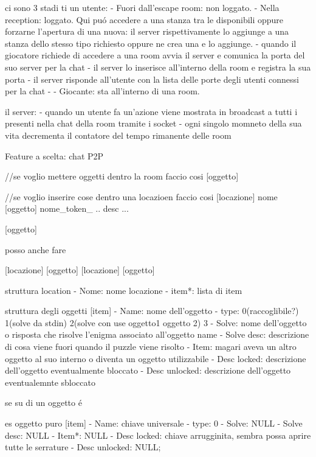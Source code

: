 ci sono 3 stadi ti un utente:
  - Fuori dall'escape room: non loggato.
  - Nella reception: loggato. Qui puó accedere a una stanza tra le disponibili oppure forzarne l'apertura di una nuova: il server rispettivamente 
  lo aggiunge a una stanza dello stesso tipo richiesto oppure ne crea una e lo aggiunge.
      - quando il giocatore richiede di accedere a una room avvia il server e comunica la porta del suo server per la chat
      - il server lo inserisce all'interno della room e registra la sua porta
      - il server risponde all'utente con la lista delle porte degli utenti connessi per la chat 
      - 
  - Giocante: sta all'interno di una room.

il server:
  - quando un utente fa un'azione viene mostrata in broadcast a tutti i presenti nella chat della room tramite
i socket
  - ogni singolo momneto della sua vita decrementa il contatore del tempo rimanente delle room 

Feature a scelta: chat P2P




//se voglio mettere oggetti dentro la room faccio cosi
[oggetto]

//se voglio inserire cose dentro una locazioen faccio cosi
[locazione] nome
  [oggetto]
    nome_token_ .. desc ...
    
  [oggetto]

posso anche fare 

[locazione]
  [oggetto]
  [locazione]
    [oggetto]
    
struttura location
  - Nome: nome locazione
  - item*: lista di item
  


struttura degli oggetti
[item]
  - Name: nome dell'oggetto
  - type: 0(raccoglibile?) 1(solve da stdin) 2(solve con use oggetto1 oggetto 2) 3  
  - Solve: nome dell'oggetto o risposta che risolve l'enigma associato all'oggetto name
  - Solve desc: descrizione di cosa viene fuori quando il puzzle viene risolto
  - Item: magari aveva un altro oggetto al suo interno o diventa un oggetto utilizzabile
  - Desc locked: descrizione dell'oggetto eventualmente bloccato
  - Desc unlocked: descrizione dell'oggetto eventualemnte sbloccato

se su di un oggetto é 

es oggetto puro
[item]
  - Name: chiave universale
  - type: 0
  - Solve: NULL
  - Solve desc: NULL
  - Item*: NULL
  - Desc locked: chiave arrugginita, sembra possa aprire tutte le serrature
  - Desc unlocked: NULL;

